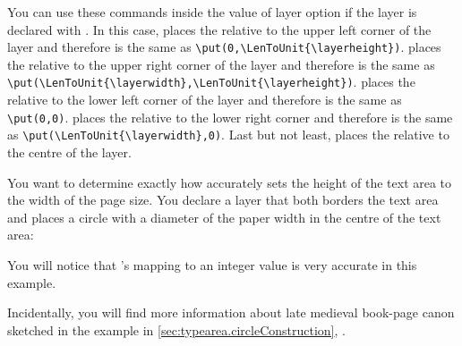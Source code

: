 \begin{Declaration}
\end{Declaration}
You can use these commands inside the
value of  layer option if the layer is declared with
. In this case,  places the
 relative to the upper left corner of the layer and therefore
is the same as
\lstinline[breaklines=false]|\put(0,\LenToUnit{\layerheight})|. 
places the  relative to the upper right corner of the layer and
therefore is the same as
\lstinline[breaklines=false]
|\put(\LenToUnit{\layerwidth},\LenToUnit{\layerheight})|.
 places the  relative to the lower left corner of
the layer and therefore is the same as
\lstinline[breaklines=false]|\put(0,0)|.  places the
 relative to the lower right corner and therefore is the same
as \lstinline[breaklines=false]|\put(\LenToUnit{\layerwidth},0)|. Last but
not least,  places the  relative to the centre of
the layer.%
\begin{Example}
  You want to determine exactly how accurately
   sets the height of the text area to
  the width of the page size. You declare a layer that both borders the text
  area and places a circle with a diameter of the paper width in the centre of
  the text area:
  You will notice that 's mapping to an integer 
  value is very accurate in this example.
\end{Example}
Incidentally, you will find more information about late medieval book-page
canon sketched in the example in \autoref{sec:typearea.circleConstruction},
.

